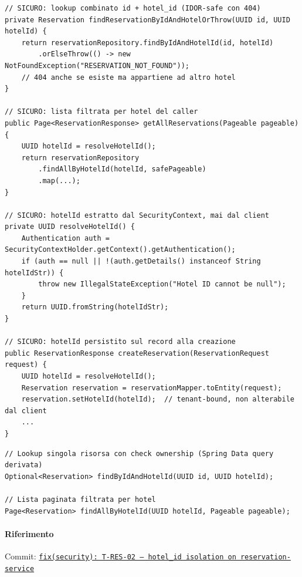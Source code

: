 ﻿\documentclass[a4paper,12pt]{report}
\newcommand{\commitref}[2]{\texttt{\small \href{https://github.com/diegoandruccioli/hotel-pms/commit/#1}{#2}}}
\begin{document}
\begin{securebox}[title={Codice Sicuro --- ReservationServiceImpl.java (fix)}]
\begin{lstlisting}[style=java]
// SICURO: lookup combinato id + hotel_id (IDOR-safe con 404)
private Reservation findReservationByIdAndHotelOrThrow(UUID id, UUID hotelId) {
    return reservationRepository.findByIdAndHotelId(id, hotelId)
        .orElseThrow(() -> new NotFoundException("RESERVATION_NOT_FOUND"));
    // 404 anche se esiste ma appartiene ad altro hotel
}

// SICURO: lista filtrata per hotel del caller
public Page<ReservationResponse> getAllReservations(Pageable pageable) {
    UUID hotelId = resolveHotelId();
    return reservationRepository
        .findAllByHotelId(hotelId, safePageable)
        .map(...);
}

// SICURO: hotelId estratto dal SecurityContext, mai dal client
private UUID resolveHotelId() {
    Authentication auth = SecurityContextHolder.getContext().getAuthentication();
    if (auth == null || !(auth.getDetails() instanceof String hotelIdStr)) {
        throw new IllegalStateException("Hotel ID cannot be null");
    }
    return UUID.fromString(hotelIdStr);
}

// SICURO: hotelId persistito sul record alla creazione
public ReservationResponse createReservation(ReservationRequest request) {
    UUID hotelId = resolveHotelId();
    Reservation reservation = reservationMapper.toEntity(request);
    reservation.setHotelId(hotelId);  // tenant-bound, non alterabile dal client
    ...
}
\end{lstlisting}
\end{securebox}

\begin{securebox}[title={ReservationRepository.java --- metodi hotel-scoped}]
\begin{lstlisting}[style=java]
// Lookup singola risorsa con check ownership (Spring Data query derivata)
Optional<Reservation> findByIdAndHotelId(UUID id, UUID hotelId);

// Lista paginata filtrata per hotel
Page<Reservation> findAllByHotelId(UUID hotelId, Pageable pageable);
\end{lstlisting}
\end{securebox}

\paragraph{Riferimento} Commit: \commitref{3e93f49}{fix(security): T-RES-02 --- hotel\_id isolation on reservation-service}
\end{document}
